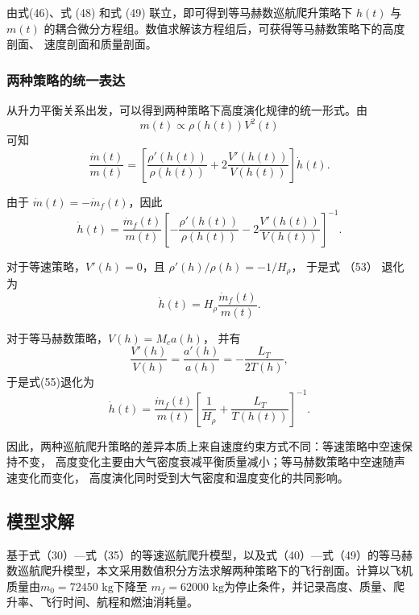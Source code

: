 \documentclass[UTF8]{ctexart}
\begin{document}
由式(46)、式 (48)
和式 (49) 联立，即可得到等马赫数巡航爬升策略下
$h(t)$ 与 $m(t)$ 的耦合微分方程组。数值求解该方程组后，可获得等马赫数策略下的高度剖面、
速度剖面和质量剖面。

\subsubsection{两种策略的统一表达}

从升力平衡关系出发，可以得到两种策略下高度演化规律的统一形式。由
\begin{equation}
    m(t)
    \propto
    \rho(h(t))V^2(t)
\end{equation}
可知
\begin{equation}
    \frac{\dot m(t)}{m(t)}
    =
    \left[
    \frac{\rho'(h(t))}{\rho(h(t))}
    +
    2\frac{V'(h(t))}{V(h(t))}
    \right]\dot h(t).
    \label{eq:unified_derivative}
\end{equation}

由于 $\dot m(t)=-\dot m_f(t)$，因此
\begin{equation}
    \dot h(t)
    =
    \frac{\dot m_f(t)}{m(t)}
    \left[
    -\frac{\rho'(h(t))}{\rho(h(t))}
    -
    2\frac{V'(h(t))}{V(h(t))}
    \right]^{-1}.
    \label{eq:unified_hdot}
\end{equation}

对于等速策略，$V'(h)=0$，且 $\rho'(h)/\rho(h)=-1/H_\rho$，
于是式 （53） 退化为
\begin{equation}
    \dot h(t)
    =
    H_\rho
    \frac{\dot m_f(t)}{m(t)}.
\end{equation}

对于等马赫数策略，$V(h)=M_ca(h)$，
并有
\begin{equation}
    \frac{V'(h)}{V(h)}
    =
    \frac{a'(h)}{a(h)}
    =
    -\frac{L_T}{2T(h)},
\end{equation}
于是式(55)退化为
\begin{equation}
    \dot h(t)
    =
    \frac{\dot m_f(t)}{m(t)}
    \left[
    \frac{1}{H_\rho}
    +
    \frac{L_T}{T(h(t))}
    \right]^{-1}.
\end{equation}

因此，两种巡航爬升策略的差异本质上来自速度约束方式不同：等速策略中空速保持不变，
高度变化主要由大气密度衰减平衡质量减小；等马赫数策略中空速随声速变化而变化，
高度演化同时受到大气密度和温度变化的共同影响。
\subsection{模型求解}
基于式（30）—式（35）的等速巡航爬升模型，以及式（40）—式（49）的等马赫数巡航爬升模型，本文采用数值积分方法求解两种策略下的飞行剖面。计算以飞机质量由$m_0=72450\text{ kg}$下降至 $m_f=62000\text{ kg}$为停止条件，并记录高度、质量、爬升率、飞行时间、航程和燃油消耗量。
\end{document}
